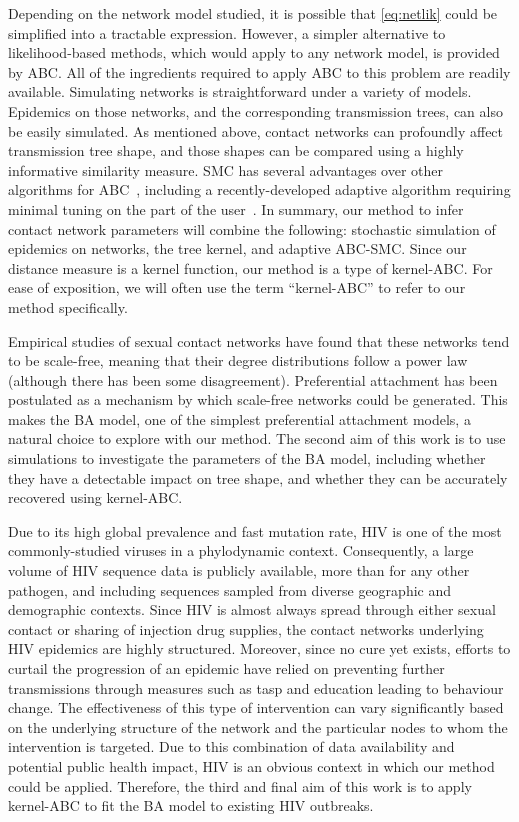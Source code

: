 Depending on the network model studied, it is possible that \cref{eq:netlik}
could be simplified into a tractable expression. However, a simpler alternative
to likelihood-based methods, which would apply to any network model, is
provided by \gls{ABC}. All of the ingredients required to apply \gls{ABC} to
this problem are readily available. Simulating networks is straightforward
under a variety of models. Epidemics on those networks, and the corresponding
transmission trees, can also be easily simulated. As mentioned above, contact
networks can profoundly affect transmission tree shape, and those shapes can be
compared using a highly informative similarity measure. \Gls{SMC} has several
advantages over other algorithms for \gls{ABC}~\autocite{mckinley2009inference},
including a recently-developed adaptive algorithm requiring minimal tuning on
the part of the user~\autocite{del2012adaptive}. In summary, our method to
infer contact network parameters will combine the following: stochastic
simulation of epidemics on networks, the tree kernel, and adaptive
\gls{ABC}-\gls{SMC}. Since our distance measure is a kernel function, our
method is a type of kernel-\gls{ABC}. For ease of exposition, we will often use
the term ``kernel-\gls{ABC}'' to refer to our method specifically.

Empirical studies of sexual contact networks have found that these networks
tend to be scale-free, meaning that their degree distributions follow a power
law (although there has been some disagreement). Preferential attachment has
been postulated as a mechanism by which scale-free networks could be generated.
This makes the \gls{BA} model, one of the simplest preferential attachment
models, a natural choice to explore with our method. The second aim of this
work is to use simulations to investigate the parameters of the \gls{BA} model,
including whether they have a detectable impact on tree shape, and whether they
can be accurately recovered using kernel-\gls{ABC}.

Due to its high global prevalence and fast mutation rate, \gls{HIV} is one of
the most commonly-studied viruses in a phylodynamic context. Consequently, a
large volume of \gls{HIV} sequence data is publicly available, more than for
any other pathogen, and including sequences sampled from diverse geographic and
demographic contexts. Since \gls{HIV} is almost always spread through either
sexual contact or sharing of injection drug supplies, the contact networks
underlying \gls{HIV} epidemics are highly structured. Moreover, since no cure
yet exists, efforts to curtail the progression of an epidemic have relied on
preventing further transmissions through measures such as \gls{tasp} and
education leading to behaviour change. The effectiveness of this type of
intervention can vary significantly based on the underlying structure of the
network and the particular nodes to whom the intervention is targeted. Due to
this combination of data availability and potential public health impact,
\gls{HIV} is an obvious context in which our method could be applied.
Therefore, the third and final aim of this work is to apply kernel-\gls{ABC} to
fit the \gls{BA} model to existing \gls{HIV} outbreaks.

